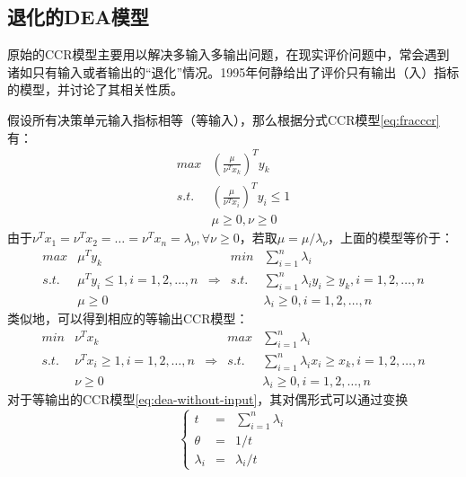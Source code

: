 \subsection{退化的DEA模型}
原始的CCR模型主要用以解决多输入多输出问题，在现实评价问题中，常会遇到诸如只有输入或者输出的“退化”情况。1995年何静给出了评价只有输出（入）指标的模型，并讨论了其相关性质\cite{he1995inputonly}。

假设所有决策单元输入指标相等（等输入），那么根据分式CCR模型\eqref{eq:fracccr}有：
\begin{equation}
\begin{array}{ll}
  \textit{max} & (\frac{\mu}{\nu^T x_k})^T y_k \\
  \textit{s.t.} & (\frac{\mu}{\nu^T x_i})^T y_i \le 1 \\
   & \mu \ge 0, \nu \ge 0
\end{array}
\end{equation}
由于$\nu^T x_1 = \nu^T x_2 = \ldots = \nu^T x_n = \lambda_\nu, \forall \nu \ge 0$，若取$\mu = \mu/\lambda_\nu$，上面的模型等价于：
\begin{equation}\label{eq:dea-without-input}
\begin{array}{lllll}
  \textit{max} & \mu^Ty_k & & \textit{min} & \sum\limits_{i=1}^n \lambda_i \\
  \textit{s.t.} & \mu^Ty_i \le 1, i=1,2,\dots,n & \Rightarrow & \textit{s.t.} & \sum\limits_{i=1}^n \lambda_i y_i \ge y_k, i=1,2,\dots,n \\
   & \mu\ge 0 & & & \lambda_i \ge 0, i=1,2,\dots,n
\end{array}
\end{equation}
类似地，可以得到相应的等输出CCR模型：
\begin{equation}\label{eq:dea-without-output}
\begin{array}{lllll}
  \textit{min} & \nu^Tx_k & & \textit{max} & \sum\limits_{i=1}^n \lambda_i \\
  \textit{s.t.} & \nu^Tx_i \ge 1, i=1,2,\dots,n & \Rightarrow & \textit{s.t.} & \sum\limits_{i=1}^n \lambda_i x_i \ge x_k, i=1,2,\dots,n\\
   & \nu \ge 0 & & & \lambda_i \ge 0, i=1,2,\dots,n
\end{array}
\end{equation}
对于等输出的CCR模型\eqref{eq:dea-without-input}，其对偶形式可以通过变换
\begin{equation}
  \left\{
    \begin{array}{lll}
      t & = & \sum\limits_{i=1}^n \lambda_i \\
      \theta & = & 1/t \\
      \lambda_i & = & \lambda_i/t
    \end{array}
  \right.
\end{equation}
